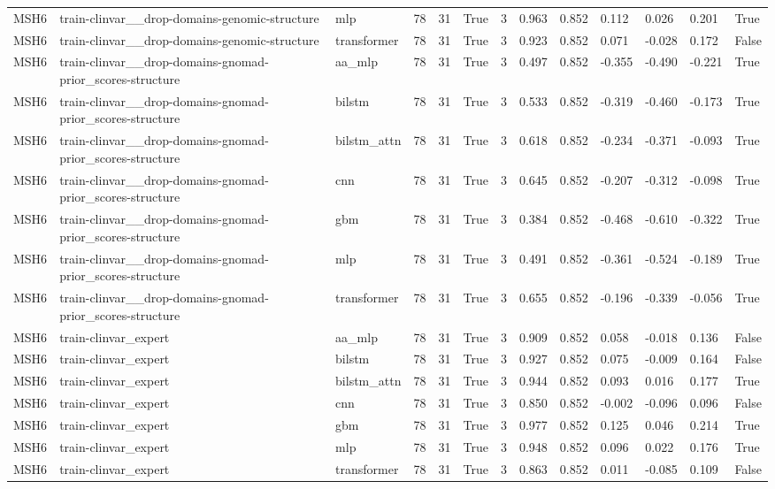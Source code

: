 \begin{table}[t]
\begin{tabular}{lllllllllllll}
MSH6 & train-clinvar\_\_drop-domains-genomic-structure & mlp & 78 & 31 & True & 3 & 0.963 & 0.852 & 0.112 & 0.026 & 0.201 & True \\
MSH6 & train-clinvar\_\_drop-domains-genomic-structure & transformer & 78 & 31 & True & 3 & 0.923 & 0.852 & 0.071 & -0.028 & 0.172 & False \\
MSH6 & train-clinvar\_\_drop-domains-gnomad-prior\_scores-structure & aa\_mlp & 78 & 31 & True & 3 & 0.497 & 0.852 & -0.355 & -0.490 & -0.221 & True \\
MSH6 & train-clinvar\_\_drop-domains-gnomad-prior\_scores-structure & bilstm & 78 & 31 & True & 3 & 0.533 & 0.852 & -0.319 & -0.460 & -0.173 & True \\
MSH6 & train-clinvar\_\_drop-domains-gnomad-prior\_scores-structure & bilstm\_attn & 78 & 31 & True & 3 & 0.618 & 0.852 & -0.234 & -0.371 & -0.093 & True \\
MSH6 & train-clinvar\_\_drop-domains-gnomad-prior\_scores-structure & cnn & 78 & 31 & True & 3 & 0.645 & 0.852 & -0.207 & -0.312 & -0.098 & True \\
MSH6 & train-clinvar\_\_drop-domains-gnomad-prior\_scores-structure & gbm & 78 & 31 & True & 3 & 0.384 & 0.852 & -0.468 & -0.610 & -0.322 & True \\
MSH6 & train-clinvar\_\_drop-domains-gnomad-prior\_scores-structure & mlp & 78 & 31 & True & 3 & 0.491 & 0.852 & -0.361 & -0.524 & -0.189 & True \\
MSH6 & train-clinvar\_\_drop-domains-gnomad-prior\_scores-structure & transformer & 78 & 31 & True & 3 & 0.655 & 0.852 & -0.196 & -0.339 & -0.056 & True \\
MSH6 & train-clinvar\_expert & aa\_mlp & 78 & 31 & True & 3 & 0.909 & 0.852 & 0.058 & -0.018 & 0.136 & False \\
MSH6 & train-clinvar\_expert & bilstm & 78 & 31 & True & 3 & 0.927 & 0.852 & 0.075 & -0.009 & 0.164 & False \\
MSH6 & train-clinvar\_expert & bilstm\_attn & 78 & 31 & True & 3 & 0.944 & 0.852 & 0.093 & 0.016 & 0.177 & True \\
MSH6 & train-clinvar\_expert & cnn & 78 & 31 & True & 3 & 0.850 & 0.852 & -0.002 & -0.096 & 0.096 & False \\
MSH6 & train-clinvar\_expert & gbm & 78 & 31 & True & 3 & 0.977 & 0.852 & 0.125 & 0.046 & 0.214 & True \\
MSH6 & train-clinvar\_expert & mlp & 78 & 31 & True & 3 & 0.948 & 0.852 & 0.096 & 0.022 & 0.176 & True \\
MSH6 & train-clinvar\_expert & transformer & 78 & 31 & True & 3 & 0.863 & 0.852 & 0.011 & -0.085 & 0.109 & False \\

\end{tabular}
\end{table}
